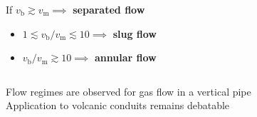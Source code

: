 \documentclass{beamer}
\begin{document}
\begin{frame}
\begin{columns}[t]
\begin{column}{0.5\paperwidth}
      If $v_{\text{b}} \gtrsim v_{\text{m}} \implies$ \textbf{separated flow}

      \begin{itemize}
        \item $ 1 \lesssim v_{\text{b}} / v_{\text{m}} \lesssim 10 \implies$ \textbf{slug flow} \\
        \item $ v_{\text{b}} / v_{\text{m}} \gtrsim 10 \implies$ \textbf{annular flow}
      \end{itemize}
    \end{column}
  \end{columns}

  Flow regimes are observed for gas flow in a vertical pipe \\

  Application to volcanic conduits remains debatable \\
\end{frame}
\end{document}

